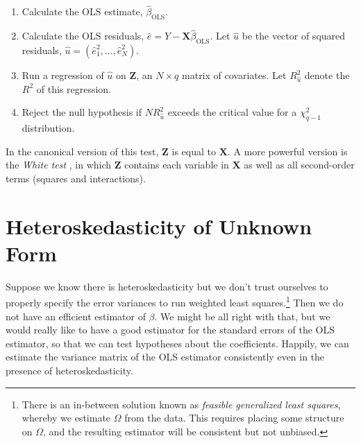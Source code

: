 \documentclass[12pt,oneside,openany]{book}
\providecommand{\tightlist}{%
  \setlength{\itemsep}{0pt}\setlength{\parskip}{0pt}}
\begin{document}
\begin{enumerate}
\def\labelenumi{\arabic{enumi}.}
\tightlist
\item
  Calculate the OLS estimate, \(\hat{\beta}_{\text{OLS}}\).
\item
  Calculate the OLS residuals,
  \(\hat{e} = Y - \mathbf{X} \hat{\beta}_{\text{OLS}}\). Let \(\hat{u}\)
  be the vector of squared residuals,
  \(\hat{u} = (\hat{e}_1^2, \ldots, \hat{e}_N^2)\).
\item
  Run a regression of \(\hat{u}\) on \(\mathbf{Z}\), an \(N \times q\)
  matrix of covariates. Let \(R_{\hat{u}}^2\) denote the \(R^2\) of this
  regression.
\item
  Reject the null hypothesis if \(N R_{\hat{u}}^2\) exceeds the critical
  value for a \(\chi_{q - 1}^2\) distribution.
\end{enumerate}

In the canonical version of this test, \(\mathbf{Z}\) is equal to
\(\mathbf{X}\). A more powerful version is the \emph{White test}
\citep{white1980heteroskedasticity}, in which \(\mathbf{Z}\) contains
each variable in \(\mathbf{X}\) as well as all second-order terms
(squares and interactions).

\section{Heteroskedasticity of Unknown
Form}\label{heteroskedasticity-of-unknown-form}

Suppose we know there is heteroskedasticity but we don't trust ourselves
to properly specify the error variances to run weighted least
squares.\footnote{There is an in-between solution known as
  \emph{feasible generalized least squares}, whereby we estimate
  \(\Omega\) from the data. This requires placing some structure on
  \(\Omega\), and the resulting estimator will be consistent but not
  unbiased.} Then we do not have an efficient estimator of \(\beta\). We
might be all right with that, but we would really like to have a good
estimator for the standard errors of the OLS estimator, so that we can
test hypotheses about the coefficients. Happily, we can estimate the
variance matrix of the OLS estimator consistently even in the presence
of heteroskedasticity.
\end{document}
